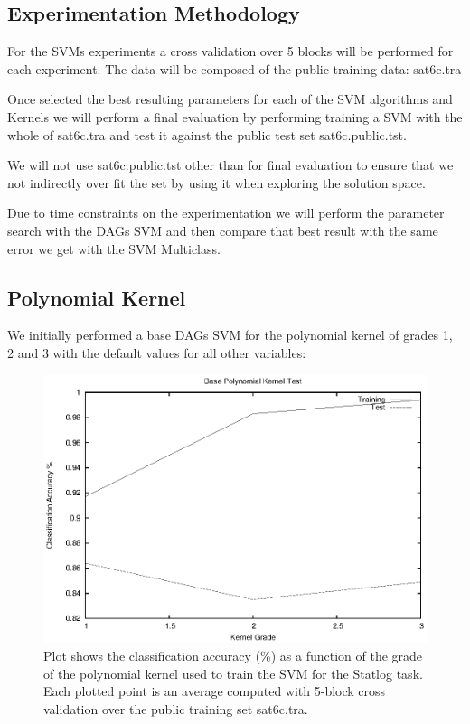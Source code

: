 \documentclass[a4paper,10pt,titlepage]{article}
\begin{document}
\subsection{Experimentation Methodology}

\par For the SVMs experiments a cross validation over 5 blocks will be performed for each experiment. The data will be composed of the public training data: sat6c.tra

\par Once selected the best resulting parameters for each of the SVM algorithms and Kernels we will perform a final evaluation by performing training a SVM with the whole of sat6c.tra and test it against the public test set sat6c.public.tst.

\par We will not use sat6c.public.tst other than for final evaluation to ensure that we not indirectly over fit the set by using it when exploring the solution space. 

\par Due to time constraints on the experimentation we will perform the parameter search with the DAGs SVM and then compare that best result with the same error we get with the SVM Multiclass.

\subsection{Polynomial Kernel}

\par We initially performed a base DAGs SVM for the polynomial kernel of grades 1, 2 and 3 with the default values for all other variables:

\begin{figure}[H]
	\centerline{%
	\includegraphics[]{base_poly.eps}
	}
	\caption[Statlog Task: Base experiment classification accuracy for polynomial kernel]{Plot shows the classification accuracy (\%)  as a function of the grade of the polynomial kernel used to train the SVM for the Statlog task. Each plotted point is an average computed with 5-block cross validation over the public training set sat6c.tra.}
\end{figure}
\end{document}
